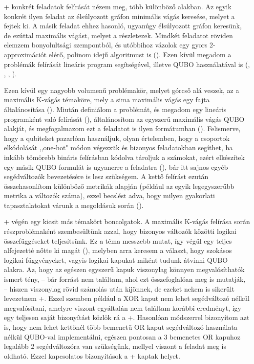 
\Az+ konkrét feladatok felírását nézem meg, több különböző alakban. 
Az egyik konkrét ilyen feladat az élsúlyozott gráfon minimális vágás keresése, melyet a  fejtek ki.
A másik feladat ehhez hasonló, ugyanúgy élsúlyozott gráfon keresünk, de ezúttal maximális vágást, melyet a  részletezek. Mindkét feladatot röviden elemzem bonyolultsági szempontból, és utóbbihoz vázolok egy gyors 2-approximációt elérő, polinom idejű algoritmust is ().
Ezen kívül megadom a problémák felírását lineáris program segítségével, illetve QUBO használatával is (, , , ).

Ezen kívül egy nagyobb volumenű problémakör, melyet górcső alá veszek, az a maximális K-vágás témaköre, mely a sima maximális vágás egy fajta általánosítása (). Miután definiálom a problémát, és megadom egy lineáris programként való felírását (), általánosítom az egyszerű maximális vágás QUBO alakját, és megfogalmazom ezt a feladatot is ilyen formátumban (). Felismerve, hogy a qubiteket pazarlóan használjuk, olyan értelemben, hogy a csoportok elkódolását ,,one-hot" módon végezzük és bizonyos feladatokban segíthet, ha inkább tömörebb bináris felírásban kódolva tároljuk a számokat, ezért elkészítek egy másik QUBO formulát is ugyanerre a feladatra (), bár itt sajnos egyéb segédváltozók bevezetésére is lesz szükségem. A kettő felírást ezután összehasonlítom különböző metrikák alapján (például az egyik legegyszerűbb metrika a változók száma), ezzel becslést adva, hogy milyen gyakorlati tapasztalatokat várunk a megoldásuk során ().

\Az+ végén egy kicsit más témakört boncolgatok. A maximális K-vágás felírása során részproblémaként szembesültünk azzal, hogy bizonyos változók közötti logikai összefüggéseket teljesítsünk. Ez a téma messzebb mutat, így végül egy teljes alfejezetté nőtte ki magát (), melyben arra keresem a választ, hogy szokásos logikai függvényeket, vagyis logikai kapukat miként tudunk átvinni QUBO alakra. Az, hogy az egészen egyszerű kapuk viszonylag könnyen megvalósíthatók ismert tény, -- bár forrást nem találtam, ahol ezt összefoglalóan meg is mutatják, -- hiszen viszonylag rövid számolás után kijönnek, de ezeket nekem is sikerült levezetnem \az+. Ezzel szemben például a XOR kaput nem lehet segédváltozó nélkül megvalósítani, amelyre viszont egyáltalán nem találtam korábbi eredményt, így egy teljesen saját bizonyítást közlök rá a \az+. Hasonlóan módszerrel bizonyítom azt is, hogy nem lehet kettőnél több bemenetű OR kaput segédváltozó használata nélkül QUBO-val implementálni, egészen pontosan a 3 bemenetes OR kapuhoz legalább 2 segédváltozóra van szükségünk, mellyel viszont a feladat meg is oldható. Ezzel kapcsolatos bizonyítások a \az+ kaptak helyet.

